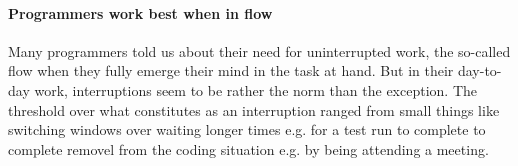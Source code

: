\paragraph{Programmers work best when in flow} Many programmers told us about their need for uninterrupted work, the so-called flow when they fully emerge their mind in the task at hand. But in their day-to-day work, interruptions seem to be rather the norm than the exception. The threshold over what constitutes as an interruption ranged from small things like switching windows over waiting longer times e.g. for a test run to complete to complete removel from the coding situation e.g. by being attending a meeting.
